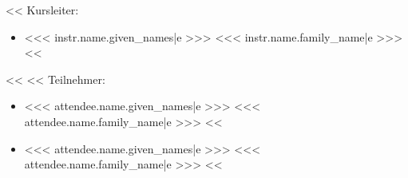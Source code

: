                 \begin{minipage}[t]{0.5\textwidth}
                    <<%
                        Kursleiter:
                        \begin{itemize}
                            <<%
                                \item <<< instr.name.given_names|e >>> <<< instr.name.family_name|e >>>
                            <<%
                        \end{itemize}
                    <<%
                    <<%
                    Teilnehmer:
                    \begin{itemize}
                        <<%
                            \item <<< attendee.name.given_names|e >>> <<< attendee.name.family_name|e >>>
                        <<%
                    \end{itemize}
                \end{minipage}%
                \begin{minipage}[t]{0.5\textwidth}
                    \begin{itemize}
                        <<%
                            \item <<< attendee.name.given_names|e >>> <<< attendee.name.family_name|e >>>
                        <<%
                    \end{itemize}
                \end{minipage}

